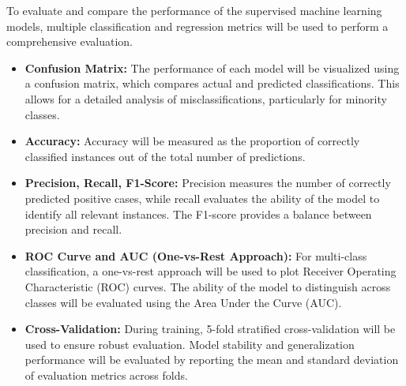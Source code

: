 To evaluate and compare the performance of the supervised machine learning models, multiple classification and regression metrics will be used to perform a comprehensive evaluation. 

\begin{itemize}
    \item \textbf{Confusion Matrix:} The performance of each model will be visualized using a confusion matrix, which compares actual and predicted classifications. This allows for a detailed analysis of misclassifications, particularly for minority classes.
    \item \textbf{Accuracy:} Accuracy will be measured as the proportion of correctly classified instances out of the total number of predictions. 
    \item \textbf{Precision, Recall, F1-Score:} Precision measures the number of correctly predicted positive cases, while recall evaluates the ability of the model to identify all relevant instances. The F1-score provides a balance between precision and recall. 
    \item \textbf{ROC Curve and AUC (One-vs-Rest Approach):} For multi-class classification, a one-vs-rest approach will be used to plot Receiver Operating Characteristic (ROC) curves. The ability of the model to distinguish across classes will be evaluated using the Area Under the Curve (AUC).
    \item \textbf{Cross-Validation:} During training, 5-fold stratified cross-validation will be used to ensure robust evaluation. Model stability and generalization performance will be evaluated by reporting the mean and standard deviation of evaluation metrics across folds.
\end{itemize}
